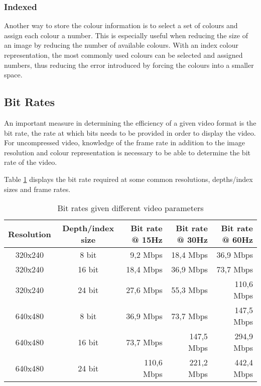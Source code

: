 \subsubsection{Indexed}
Another way to store the colour information is to select a set of colours and assign each colour a number.
This is especially useful when reducing the size of an image by reducing the number of available colours.
With an index colour representation, the most commonly used colours can be selected and assigned numbers, thus reducing the error introduced by forcing the colours into a smaller space.

\subsection{Bit Rates}
An important measure in determining the efficiency of a given video format is the bit rate, the rate at which bits needs to be provided in order to display the video.
For uncompressed video, knowledge of the frame rate in addition to the image resolution and colour representation is necessary to be able to determine the bit rate of the video.

Table \ref{tab:BitRates} displays the bit rate required at some common resolutions, depths/index sizes and frame rates.
\begin{table}[h]
    \centering
    \begin{tabular}{ccrrr}
        Resolution & Depth/index size & Bit rate @ 15Hz & Bit rate @ 30Hz & Bit rate @ 60Hz \\
        \hline
        320x240 & 8 bit & 9,2 Mbps   & 18,4 Mbps  & 36,9 Mbps  \\
        320x240 & 16 bit & 18,4 Mbps  & 36,9 Mbps  & 73,7 Mbps  \\
        320x240 & 24 bit & 27,6 Mbps  & 55,3 Mbps  & 110,6 Mbps \\
        640x480 & 8 bit & 36,9 Mbps  & 73,7 Mbps  & 147,5 Mbps \\
        640x480 & 16 bit & 73,7 Mbps  & 147,5 Mbps & 294,9 Mbps \\
        640x480 & 24 bit & 110,6 Mbps & 221,2 Mbps & 442,4 Mbps
    \end{tabular}
    \caption{Bit rates given different video parameters}
    \label{tab:BitRates}
\end{table}
